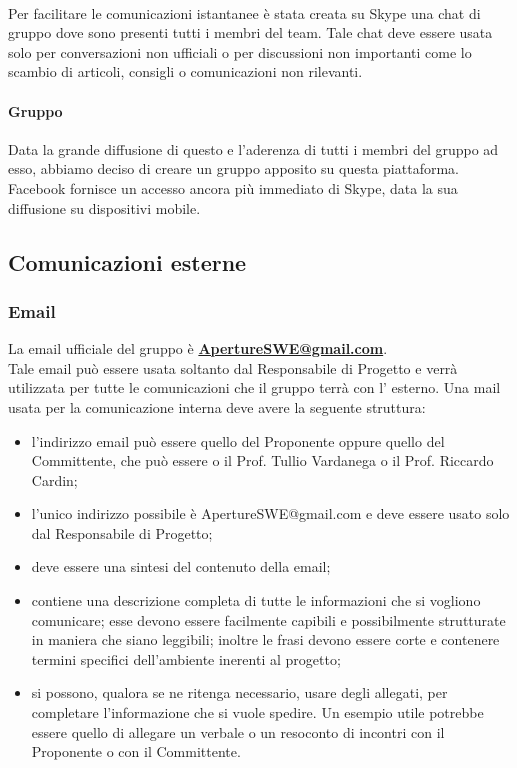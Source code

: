 \paragraph{}
Per facilitare le comunicazioni istantanee è stata creata su Skype una chat di gruppo dove sono presenti tutti i membri del team. Tale chat deve essere usata solo per conversazioni non ufficiali o per discussioni non importanti come lo scambio di articoli, consigli o comunicazioni non rilevanti.

\paragraph{Gruppo }
Data la grande diffusione di questo  e l'aderenza di tutti i membri del gruppo ad esso, abbiamo deciso di creare un gruppo apposito su questa piattaforma. Facebook fornisce un accesso ancora più immediato di Skype, data la sua diffusione su dispositivi mobile.

\subsection{Comunicazioni esterne}
\subsubsection{Email}
La email ufficiale del gruppo è \textbf{\url{ApertureSWE@gmail.com}}.\\
Tale email può essere usata soltanto dal Responsabile di Progetto e verrà utilizzata per tutte le comunicazioni che il gruppo terrà con l' esterno.
Una mail usata per la comunicazione interna deve avere la seguente struttura:
\begin{itemize}
\item {} l'indirizzo email può essere quello del Proponente oppure quello del Committente, che può essere o il Prof. Tullio Vardanega o il Prof. Riccardo Cardin;
\item {} l'unico indirizzo possibile è ApertureSWE@gmail.com e deve essere usato solo dal Responsabile di Progetto;
\item {} deve essere una sintesi del contenuto della email;
\item {} contiene una descrizione completa di tutte le informazioni che si vogliono comunicare; esse devono essere facilmente capibili e possibilmente strutturate in maniera che siano leggibili; inoltre le frasi devono essere corte e contenere termini specifici dell'ambiente  inerenti al progetto;
\item {} si possono, qualora se ne ritenga necessario, usare degli allegati, per completare l'informazione che si vuole spedire. Un esempio utile potrebbe essere quello di allegare un verbale o un resoconto di incontri con il Proponente  o con il Committente.
\end{itemize}


